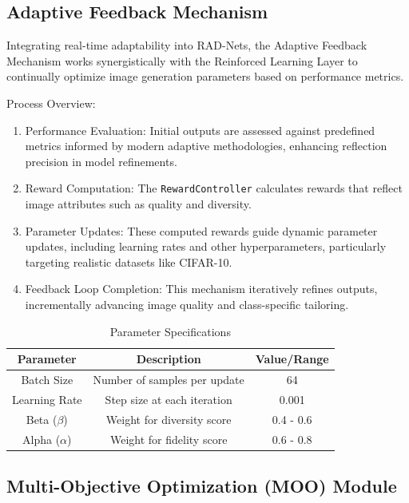 \subsection{Adaptive Feedback Mechanism}

Integrating real-time adaptability into RAD-Nets, the Adaptive Feedback Mechanism works synergistically with the Reinforced Learning Layer to continually optimize image generation parameters based on performance metrics. 

Process Overview:
\begin{enumerate}
    \item Performance Evaluation: Initial outputs are assessed against predefined metrics informed by modern adaptive methodologies, enhancing reflection precision in model refinements.
    \item Reward Computation: The \texttt{RewardController} calculates rewards that reflect image attributes such as quality and diversity.
    \item Parameter Updates: These computed rewards guide dynamic parameter updates, including learning rates and other hyperparameters, particularly targeting realistic datasets like CIFAR-10.
    \item Feedback Loop Completion: This mechanism iteratively refines outputs, incrementally advancing image quality and class-specific tailoring.
\end{enumerate}

\begin{table}[h]
\centering
\begin{tabular}{|c|c|c|}
\hline
\textbf{Parameter} & \textbf{Description} & \textbf{Value/Range} \\ \hline
Batch Size & Number of samples per update & 64 \\ \hline
Learning Rate & Step size at each iteration & 0.001 \\ \hline
Beta (\(\beta\)) & Weight for diversity score & 0.4 - 0.6 \\ \hline
Alpha (\(\alpha\)) & Weight for fidelity score & 0.6 - 0.8 \\ \hline
\end{tabular}
\caption{Parameter Specifications}
\end{table}

\subsection{Multi-Objective Optimization (MOO) Module}

